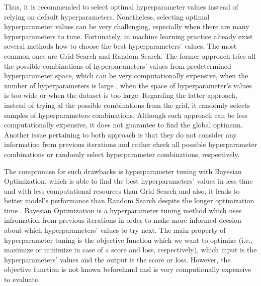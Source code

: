 Thus, it is recommended to select optimal hyperparameter values instead of relying on default hyperparameters.
Nonetheless, selecting optimal hyperparameter values can be very challenging, especially when there are many hyperparameters to tune.
Fortunately, in machine learning practice already exist several methods how to choose the best hyperparameters' values. The most common ones are Grid Search and Random Search.
The former approach tries all the possible combinations of hyperparameters' values from predetermined hyperparameter space, which can be very computationally expensive, when the number of hyperparameters is large \citep{marinov2019hyperparameter}, when the space of hyperparameter's values is too wide or when the dataset is too large.
Regarding the latter approach, instead of trying al the possible combinations from the grid, it randomly selects samples of hyperparameters combinations. Although such approach can be less computationally expensive, it does not guarantee to find the global optimum.
Another issue pertaining to both approach is that they do not consider any information from previous iterations and rather check all possible hyperparameter combinations or randomly select hyperparameter combinations, respectively.

The compromise for such drawbacks is hyperparameter tuning with Bayesian Optimization, which is able to find the best hyperparameters' values in less time and with less computational resources than Grid Search and also, it leads to better model's performance than Random Search despite the longer optimization time \citep{drahokoupil2022application}.
Bayesian Optimization is a hyperparameter tuning method which uses infromation from previous iterations in order to make more informed decsion about which hyperparameters' values to try next.
The main property of hyperparameter tuning is the objective function which we want to optimize (i.e., maximize or minimize in case of a score and loss, respectively), which input is the hyperparameters' values and the output is the score or loss. However, the objective function is not known beforehand and is very computionally expensive to evaluate.


